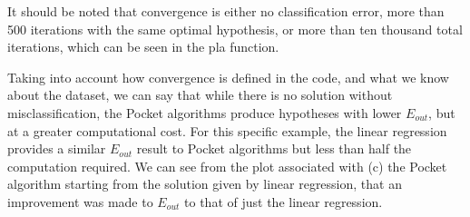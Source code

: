 \documentclass[a4paper]{article}
\begin{document}
\begin {description}
\begin{doublespace}
It should be noted that convergence is either no classification error, more than 500 iterations with the same optimal hypothesis, or more than ten thousand total iterations, which can be seen in the pla function.



Taking into account how convergence is defined in the code, and what we know about the dataset, we can say that while there is no solution without misclassification, the Pocket algorithms produce hypotheses with lower $E_{out}$, but at a greater computational cost. For this specific example, the linear regression provides a similar $E_{out}$ result to Pocket algorithms but less than half the computation required. We can see from the plot associated with (c) the Pocket algorithm starting from the solution given by linear regression, that an improvement was made to $E_{out}$ to that of just the linear regression.


\end{doublespace}
\end{description}
\end{document}
